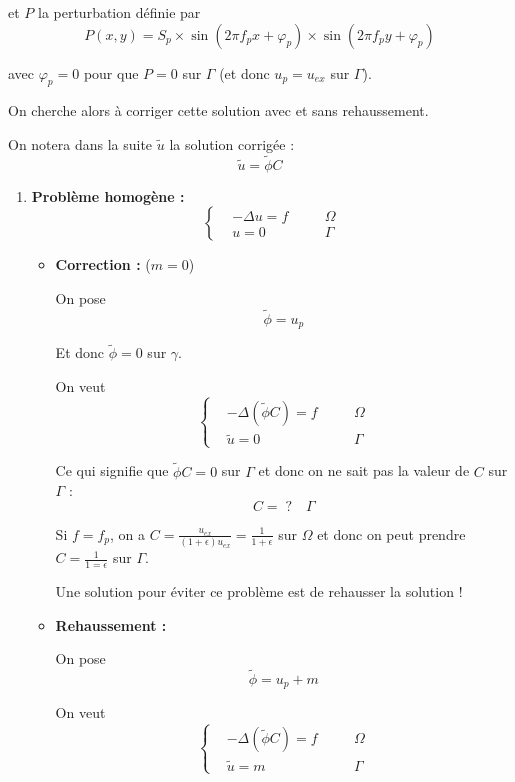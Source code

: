 et $P$ la perturbation définie par
$$P(x,y)=S_p\times\sin(2\pi f_px + \varphi_p)\times\sin(2\pi f_py + \varphi_p)$$

avec $\varphi_p=0$ pour que $P=0$ sur $\Gamma$ (et donc $u_p=u_{ex}$ sur $\Gamma$). 

On cherche alors à corriger cette solution avec et sans rehaussement.

On notera dans la suite $\tilde{u}$ la solution corrigée :
$$\tilde{u}=\tilde{\phi}C$$

\begin{enumerate}[label=\textbullet]
	\item \textbf{Problème homogène :}
	$$\left\{\begin{aligned}
		&-\Delta u=f \quad &&\Omega \\
		&u=0 \quad &&\Gamma
	\end{aligned}\right.$$

	\begin{itemize}
		\item \textbf{Correction :} ($m=0$)
		
		On pose
		$$\tilde{\phi}=u_p$$
		
		Et donc $\tilde{\phi}=0$ sur $\gamma$.
		
		On veut 
		$$\left\{\begin{aligned}
			&-\Delta(\tilde{\phi}C)=f \quad &&\Omega \\
			&\tilde{u}=0 \quad &&\Gamma
		\end{aligned}\right.$$
	
		Ce qui signifie que $\tilde{\phi}C=0$ sur $\Gamma$ et donc on ne sait pas la valeur de $C$ sur $\Gamma$ :
		$$C=\;? \quad\Gamma$$
		
		\begin{Rem}
			Si $f=f_p$, on a $C=\frac{u_{ex}}{(1+\epsilon)u_{ex}}=\frac{1}{1+\epsilon}$ sur $\Omega$ et donc on peut prendre $C=\frac{1}{1=\epsilon}$ sur $\Gamma$.
		\end{Rem}
	
		Une solution pour éviter ce problème est de rehausser la solution !
		
		\newpage
		\item \textbf{Rehaussement :}
		
		On pose
		$$\tilde{\phi}=u_p+m$$
		
		On veut 
		$$\left\{\begin{aligned}
			&-\Delta(\tilde{\phi}C)=f \quad &&\Omega \\
			&\tilde{u}=m \quad &&\Gamma
		\end{aligned}\right.$$
	

\end{itemize}
\end{enumerate}
